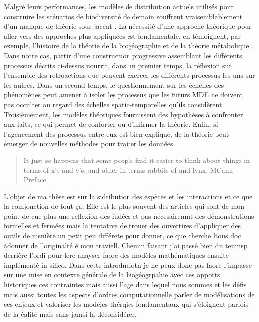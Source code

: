 Malgré leurs performances, les modèles de distribution actuels utilisés
pour construire les scénarios de biodiversité de demain souffrent
vraisemblablement d'un manque de théorie sous-jacent
\cite{Beck2012,Lomolino2000}. La nécessité d'une approche théorique pour
aller vers des approches plus appliquées est fondamentale, en
témoignent, par exemple, l'histoire de la théorie de la biogéographie
\cite{MacArthur1967} et de la théorie métabolique \cite{Brown2004}. Dans
notre cas, partir d'une construction progressive assemblant les
différents processus décrits ci-dessus nourrit, dans un premier temps,
la réflexion sur l'ensemble des retroactions que peuvent exercer les
différents processus les uns sur les autres\cite{Thuiller2013}. Dans un
second temps, le questionnement sur les échelles des phénomènes peut
amener à isoler les processus que les futurs MDE ne doivent pas occulter
au regard des échelles spatio-temporelles qu'ils considèrent.
Troisièmement, les modèles théoriques fournissent des hypothèses à
confronter aux faits, ce qui permet de conforter ou d'infirmer la
théorie. Enfin, si l'agencement des processus entre eux est bien
expliqué, de la théorie peut émerger de nouvelles méthodes pour traiter
les données.

\begin{quote}
It just so happens that some people find it easier to think about things
in terms of x's and y's, and other in terms rabbits of and lynx. MCann
Preface
\end{quote}

L'objet de ma thèse est sur la sidtibution des espèces et les
interactions et ce que la comjonction de tout ça. Elle est le plus
souvent des articles qui sont de mon point de cue plus une reflexion des
iudées et pas nécesairemnt des démonstrations formelles et fermées mais
la tentative de trouer des ouvertires d'appliquer des outils de msnière
un petit peu différete pour donner, ce que cherche ltous doc àdonner de
l'originalté é mon traviell. Chemin faisant j'ai passé bien du tenmsp
derrière l'ordi pour lere anayser faore des modèles mathématiques
ensuite implémenté in silico. Dans cette introduciotn je ne peux donc
pas faore l'impasse sur une mise en contexte générale de la
biogéogrpahie avec ces apports historiques ces contraintes mais aussi
l'age dans lequel nous sommes et les défis mais aussi toutes les aspects
d'ordres computationnelle parler de modélisations de ces enjeux et
valoriser les modèles thérqies fondamentaux qui s'éloignent parfois de
la éalité mais sans jamsi la déconsidérer.

